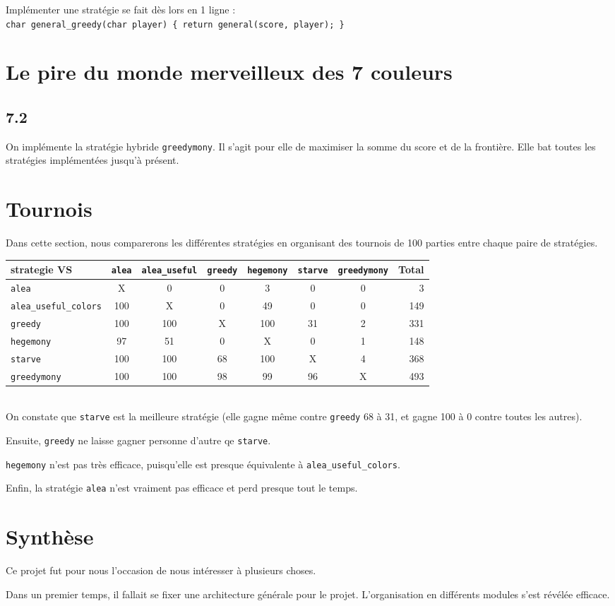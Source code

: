 \documentclass[12pt]{article}
\def\question#1{\subsection*{#1}}
\def\sec#1{\section{#1}}
\begin{document}
Implémenter une stratégie se fait dès lors en 1 ligne :\\
\texttt{char general\_greedy(char player) \{ return general(score, player); \}}


\sec{Le pire du monde merveilleux des 7 couleurs}
\question{7.2}
On implémente la stratégie hybride \texttt{greedymony}. Il s'agit pour elle de maximiser la somme du score et de la frontière. Elle bat toutes les stratégies implémentées jusqu'à présent.

\sec{Tournois}
Dans cette section, nous comparerons les différentes stratégies en organisant des tournois de 100 parties entre chaque paire de stratégies.\\


\begin{tabular}{l|c|c|c|c|c|c|r}
strategie VS & \texttt{alea} & \texttt{alea\_useful} & \texttt{greedy} & \texttt{hegemony} & \texttt{starve} & \texttt{greedymony} & Total\\
\hline
\texttt{alea} & X & 0 & 0 & 3 & 0 & 0 & 3\\
\hline
\texttt{alea\_useful\_colors} & 100 & X & 0 & 49 & 0 & 0 & 149\\
\hline
\texttt{greedy} & 100 & 100 & X & 100 & 31 & 2 & 331\\
\hline
\texttt{hegemony} & 97 & 51 & 0 & X & 0 & 1 & 148\\
\hline
\texttt{starve} & 100 & 100 & 68 & 100 & X & 4 & 368\\
\hline
\texttt{greedymony} & 100 & 100 & 98 & 99 & 96 & X & 493\\
\hline
\end{tabular}\\

On constate que \texttt{starve} est la meilleure stratégie (elle gagne même contre \texttt{greedy} 68 à 31, et gagne 100 à 0 contre toutes les autres).

Ensuite, \texttt{greedy} ne laisse gagner personne d'autre qe \texttt{starve}.

\texttt{hegemony} n'est pas très efficace, puisqu'elle est presque équivalente à \texttt{alea\_useful\_colors}.

Enfin, la stratégie \texttt{alea} n'est vraiment pas efficace et perd presque tout le temps. 

\sec{Synthèse}
Ce projet fut pour nous l'occasion de nous intéresser à plusieurs choses.

Dans un premier temps, il fallait se fixer une architecture générale pour le projet. L'organisation en différents modules s'est révélée efficace.
\end{document}

